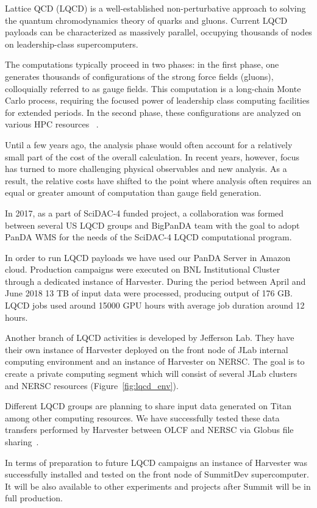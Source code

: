 \documentclass{webofc}
\begin{document}
Lattice QCD (LQCD) is a well-established non-perturbative approach to solving the quantum chromodynamics theory of quarks and gluons.  Current LQCD payloads can be characterized as massively parallel, occupying thousands of nodes on leadership-class supercomputers. 

The computations typically proceed in two phases: in the first phase, one generates thousands of configurations of the strong force fields (gluons), colloquially referred to as gauge fields. This computation is a long-chain Monte Carlo process, requiring the focused power of leadership class computing facilities for extended periods. In the second phase, these configurations are analyzed on various HPC resources ~\cite{Babich:2010:PQL:1884643.1884695}.

Until a few years ago, the analysis phase would often account for a relatively small part of the cost of the overall calculation. In recent years, however, focus has turned to more challenging physical observables and new analysis. As a result, the relative costs have shifted to the point where analysis often requires an equal or greater amount of computation than gauge field generation.

In 2017, as a part of SciDAC-4 funded project, a collaboration was formed between several US LQCD groups and BigPanDA team with the goal to adopt PanDA WMS for the needs of the SciDAC-4 LQCD computational program.

In order to run LQCD payloads we have used our PanDA Server in Amazon cloud. Production campaigns were executed on BNL Institutional Cluster through a dedicated instance of Harvester. During the period between April and June 2018 13 TB of input data were processed, producing output of 176 GB. LQCD jobs used around 15000 GPU hours with average job duration around 12 hours.

Another branch of LQCD activities is developed by Jefferson Lab. They have their own instance of Harvester deployed on the front node of JLab internal computing environment and an instance of Harvester on NERSC. The goal is to create a private computing segment which will consist of several JLab clusters and NERSC resources (Figure~\ref{fig:lqcd_env}).

Different LQCD groups are planning to share input data generated on Titan among other computing resources. We have successfully tested these data transfers performed by Harvester between OLCF and NERSC via Globus file sharing~\cite{Globusdatatransfer}.

In terms of preparation to future LQCD campaigns an instance of Harvester was successfully installed and tested on the front node of SummitDev supercomputer. It will be also available to other experiments and projects after Summit will be in full production.
\end{document}
